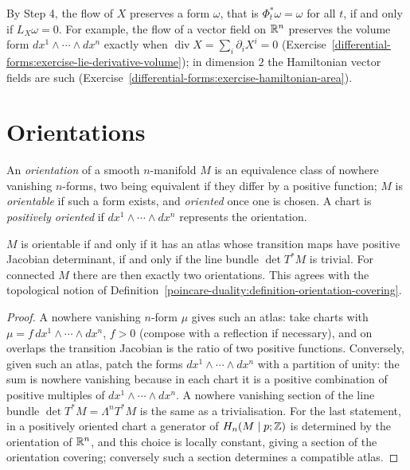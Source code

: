 By Step 4, the flow of $X$ preserves a form $\omega$, that is $\Phi_t^*\omega = \omega$ for all $t$, if and only if $L_X\omega = 0$. For example, the flow of a vector field on $\mathbb{R}^n$
preserves the volume form $dx^1 \wedge \cdots \wedge dx^n$ exactly when $\operatorname{div}X = \sum_i\partial_iX^i = 0$
(Exercise~\ref{differential-forms:exercise-lie-derivative-volume}); in dimension $2$ the Hamiltonian vector fields are such
(Exercise~\ref{differential-forms:exercise-hamiltonian-area}).

\section{Orientations}\label{differential-forms:section-orientations}

\begin{definition}\label{differential-forms:definition-orientation}
An \emph{orientation} of a smooth $n$-manifold $M$ is an equivalence class of nowhere vanishing $n$-forms, two being equivalent if they differ by a positive function; $M$ is \emph{orientable} if such a
form exists, and \emph{oriented} once one is chosen. A chart is \emph{positively oriented} if $dx^1 \wedge \cdots \wedge dx^n$ represents the orientation.
\end{definition}

\begin{proposition}\label{differential-forms:proposition-orientation}
$M$ is orientable if and only if it has an atlas whose transition maps have positive Jacobian determinant, if and only if the line bundle $\det T^*M$ is trivial. For connected $M$ there are then exactly two
orientations. This agrees with the topological notion of Definition~\ref{poincare-duality:definition-orientation-covering}.
\end{proposition}

\begin{proof}
A nowhere vanishing $n$-form $\mu$ gives such an atlas: take charts with $\mu = f\,dx^1 \wedge \cdots \wedge dx^n$, $f > 0$ (compose with a reflection if necessary), and on overlaps the transition Jacobian is
the ratio of two positive functions. Conversely, given such an atlas, patch the forms $dx^1 \wedge \cdots \wedge dx^n$ with a partition of unity: the sum is nowhere vanishing because in each chart it is a
positive combination of positive multiples of $dx^1 \wedge \cdots \wedge dx^n$. A nowhere vanishing section of the line bundle $\det T^*M = \Lambda^nT^*M$ is the same as a trivialisation. For the last
statement, in a positively oriented chart a generator of $H_n(M \mid p; \mathbb{Z})$ is determined by the orientation of $\mathbb{R}^n$, and this choice is locally constant, giving a section of the orientation covering;
conversely such a section determines a compatible atlas.
\end{proof}

